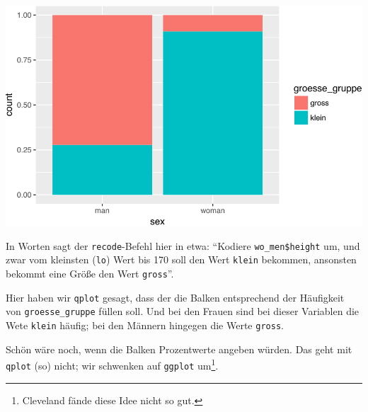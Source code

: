 \documentclass[12pt,]{book}
\newenvironment{Shaded}{\begin{snugshade}}{\end{snugshade}}
\newcommand{\KeywordTok}[1]{\textcolor[rgb]{0.13,0.29,0.53}{\textbf{{#1}}}}
\newcommand{\DataTypeTok}[1]{\textcolor[rgb]{0.13,0.29,0.53}{{#1}}}
\newcommand{\DecValTok}[1]{\textcolor[rgb]{0.00,0.00,0.81}{{#1}}}
\newcommand{\StringTok}[1]{\textcolor[rgb]{0.31,0.60,0.02}{{#1}}}
\newcommand{\NormalTok}[1]{{#1}}
\let\rmarkdownfootnote\footnote%
\def\footnote{\protect\rmarkdownfootnote}
\begin{document}
\begin{Shaded}
\end{Shaded}

\begin{center}\includegraphics[width=0.7\linewidth]{050_Daten_visualisieren_files/figure-latex/unnamed-chunk-22-1} \end{center}

In Worten sagt der \texttt{recode}-Befehl hier in etwa: ``Kodiere
\texttt{wo\_men\$height} um, und zwar vom kleinsten (\texttt{lo}) Wert
bis 170 soll den Wert \texttt{klein} bekommen, ansonsten bekommt eine
Größe den Wert \texttt{gross}''.

Hier haben wir \texttt{qplot} gesagt, dass der die Balken entsprechend
der Häufigkeit von \texttt{groesse\_gruppe} füllen soll. Und bei den
Frauen sind bei dieser Variablen die Wete \texttt{klein} häufig; bei den
Männern hingegen die Werte \texttt{gross}.

Schön wäre noch, wenn die Balken Prozentwerte angeben würden. Das geht
mit \texttt{qplot} (so) nicht; wir schwenken auf \texttt{ggplot}
um\footnote{Cleveland fände diese Idee nicht so gut.}.
\end{document}
